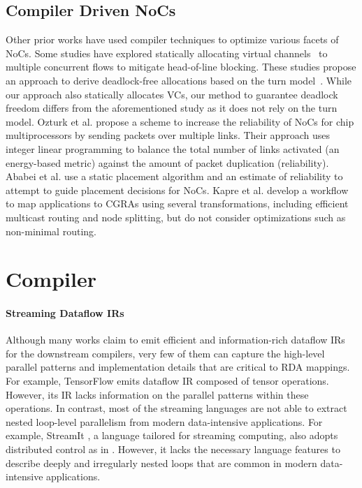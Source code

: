 \subsection{Compiler Driven NoCs}
Other prior works have used compiler techniques to optimize various facets of NoCs.
Some studies have explored statically allocating virtual channels~\cite{staticVC-isca, staticVC-nocs} to multiple concurrent flows to mitigate head-of-line blocking. These studies propose an approach to derive deadlock-free allocations based on the turn model~\cite{turnModel}. While our approach also statically allocates VCs, our method to guarantee deadlock freedom differs from the aforementioned study as it does not rely on the turn model.
Ozturk et al. \cite{ozturk2010compiler} propose a scheme to increase the reliability of NoCs for chip multiprocessors by sending packets over multiple links.
Their approach uses integer linear programming to balance the total number of links activated (an energy-based metric) against the amount of packet duplication (reliability).
Ababei et al. \cite{ababei2011energy} use a static placement algorithm and an estimate of reliability to attempt to guide placement decisions for NoCs.
Kapre et al. \cite{kapre2011noc} develop a workflow to map applications to CGRAs using several transformations, including efficient multicast routing and node splitting, but do not consider optimizations such as non-minimal routing.


\section{Compiler}
\paragraph{Streaming Dataflow IRs}
Although many works claim to emit efficient and information-rich dataflow IRs for the downstream compilers, very few of them can capture the high-level parallel patterns and implementation details that are critical to RDA mappings. For example, TensorFlow \cite{tensorflow} emits dataflow IR composed of tensor operations. However, its IR lacks information on the parallel patterns within these operations. In contrast, most of the streaming languages \cite{streamit, synaid, maxj} are not able to extract nested loop-level parallelism from modern data-intensive applications. For example, StreamIt \cite{streamit}, a language tailored for streaming computing, also adopts distributed control as in \name{}. However, it lacks the necessary language features to describe deeply and irregularly nested loops that are common in modern data-intensive applications.

